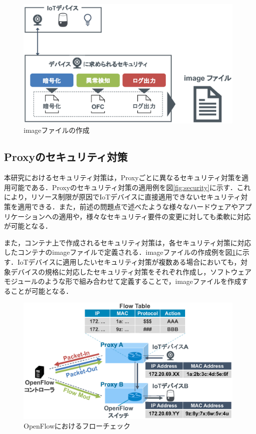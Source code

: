 \documentclass[a4paper,10pt,twocolumn,uplatex]{jsarticle}
\begin{document}
\begin{figure}[!tb]
  \centering
  \includegraphics[width=\linewidth]{img/dockerimage.eps}
  \caption{imageファイルの作成}
  \label{fig:dockerimage}
\end{figure}

\subsection{Proxyのセキュリティ対策}
本研究におけるセキュリティ対策は，Proxyごとに異なるセキュリティ対策を適用可能である．Proxyのセキュリティ対策の適用例を図\ref{fig:security}に示す．これにより，リソース制限が原因でIoTデバイスに直接適用できないセキュリティ対策を適用できる．また，前述の問題点で述べたような様々なハードウェアやアプリケーションへの適用や，様々なセキュリティ要件の変更に対しても柔軟に対応が可能となる．\par
また，コンテナ上で作成されるセキュリティ対策は，各セキュリティ対策に対応したコンテナのimageファイルで定義される．imageファイルの作成例を図\ref{fig:dockerimage}に示す．IoTデバイスに適用したいセキュリティ対策が複数ある場合においても，対象デバイスの規格に対応したセキュリティ対策をそれぞれ作成し，ソフトウェアモジュールのような形で組み合わせて定義することで，imageファイルを作成することが可能となる．

\begin{figure}[!tb]
  \centering
  \includegraphics[width=\linewidth]{img/openflow.eps}
  \caption{OpenFlowにおけるフローチェック}
  \label{fig:openflow}
\end{figure}
\end{document}

